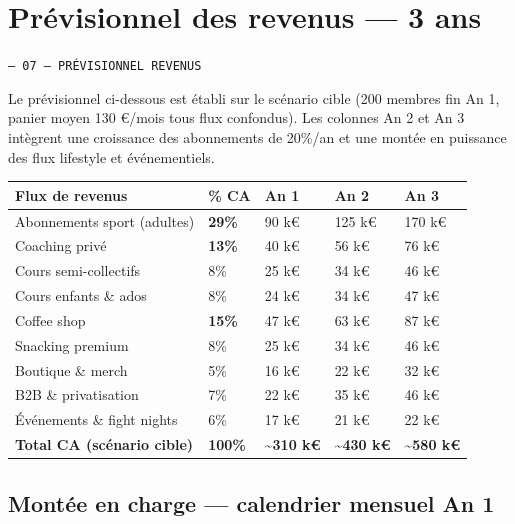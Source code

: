 \documentclass[11pt, a4paper]{article}
\newcommand{\eyebrow}[1]{%
  \vspace{4pt}
  {\small\color{fc-ink3}\texttt{— #1}}
  \vspace{2pt}
}
\newcommand{\redcell}[1]{\textcolor{fc-red}{\textbf{#1}}}
\newcommand{\goldcell}[1]{\textcolor{fc-gold}{\textbf{#1}}}
\begin{document}
\section{Prévisionnel des revenus — 3 ans}
\eyebrow{07 — PRÉVISIONNEL REVENUS}

Le prévisionnel ci-dessous est établi sur le scénario cible (200 membres fin An 1, panier moyen 130 €/mois tous flux confondus). Les colonnes An 2 et An 3 intègrent une croissance des abonnements de 20\%/an et une montée en puissance des flux lifestyle et événementiels.

\begin{center}
\begin{tabular}{@{}p{5.5cm}p{1.5cm}p{2.2cm}p{2.2cm}p{2.2cm}@{}}
\toprule
\rowcolor{fc-ink}\color{white}\textbf{Flux de revenus} & \color{white}\textbf{\% CA} & \color{white}\textbf{An 1} & \color{white}\textbf{An 2} & \color{white}\textbf{An 3} \\
\midrule
Abonnements sport (adultes) & \redcell{29\%} & 90 k€ & 125 k€ & 170 k€ \\
\rowcolor{fc-bg2} Coaching privé & \redcell{13\%} & 40 k€ & 56 k€ & 76 k€ \\
Cours semi-collectifs & 8\% & 25 k€ & 34 k€ & 46 k€ \\
\rowcolor{fc-bg2} Cours enfants \& ados & 8\% & 24 k€ & 34 k€ & 47 k€ \\
Coffee shop & \goldcell{15\%} & 47 k€ & 63 k€ & 87 k€ \\
\rowcolor{fc-bg2} Snacking premium & 8\% & 25 k€ & 34 k€ & 46 k€ \\
Boutique \& merch & 5\% & 16 k€ & 22 k€ & 32 k€ \\
\rowcolor{fc-bg2} B2B \& privatisation & 7\% & 22 k€ & 35 k€ & 46 k€ \\
Événements \& fight nights & 6\% & 17 k€ & 21 k€ & 22 k€ \\
\midrule
\textbf{Total CA (scénario cible)} & \textbf{100\%} & \textbf{\textasciitilde310 k€} & \textbf{\textasciitilde430 k€} & \textbf{\textasciitilde580 k€} \\
\bottomrule
\end{tabular}
\end{center}

\subsection{Montée en charge — calendrier mensuel An 1}
\end{document}
